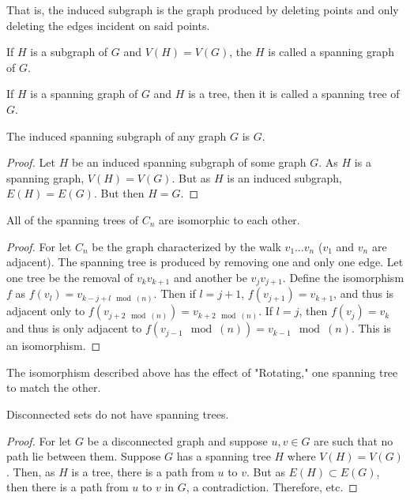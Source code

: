         That is, the induced subgraph is the graph produced by deleting points
        and only deleting the edges incident on said points.
        \begin{definition}
        If $H$ is a subgraph of $G$ and $V(H)=V(G)$, the $H$ is called a spanning graph of $G$.
        \end{definition}
        \begin{definition}
        If $H$ is a spanning graph of $G$ and $H$ is a tree, then it is called a spanning tree of $G$.
        \end{definition}
        \begin{theorem}
        The induced spanning subgraph of any graph $G$ is $G$.
        \end{theorem}
        \begin{proof}
        Let $H$ be an induced spanning subgraph of some graph $G$. As $H$ is a spanning graph, $V(H)=V(G)$. But as $H$ is an induced subgraph, $E(H)=E(G)$. But then $H=G$.
        \end{proof}
        \begin{theorem}
        All of the spanning trees of $C_n$ are isomorphic to each other.
        \end{theorem}
        \begin{proof}
        For let $C_n$ be the graph characterized by the walk $v_1\hdots v_n$ ($v_1$ and $v_n$ are adjacent). The spanning tree is produced by removing one and only one edge. Let one tree be the removal of $v_{k}v_{k+1}$ and another be $v_{j}v_{j+1}$. Define the isomorphism $f$ as $f(v_l) = v_{k-j+l \mod(n)}$. Then if $l=j+1$, $f(v_{j+1}) = v_{k+1}$, and thus is adjacent only to $f(v_{j+2 \mod(n)}) = v_{k+2\mod(n)}$. If $l=j$, then $f(v_j) = v_k$ and thus is only adjacent to $f(v_{j-1}\mod(n)) = v_{k-1}\mod(n)$. This is an isomorphism.
        \end{proof}
        The isomorphism described above has the effect of "Rotating," one spanning tree to match the other.
        \begin{theorem}
        Disconnected sets do not have spanning trees.
        \end{theorem}
        \begin{proof}
        For let $G$ be a disconnected graph and suppose $u,v\in G$ are such that no path lie between them. Suppose $G$ has a spanning tree $H$ where $V(H)=V(G)$. Then, as $H$ is a tree, there is a path from $u$ to $v$. But as $E(H)\subset E(G)$, then there is a path from $u$ to $v$ in $G$, a contradiction. Therefore, etc.
        \end{proof}
